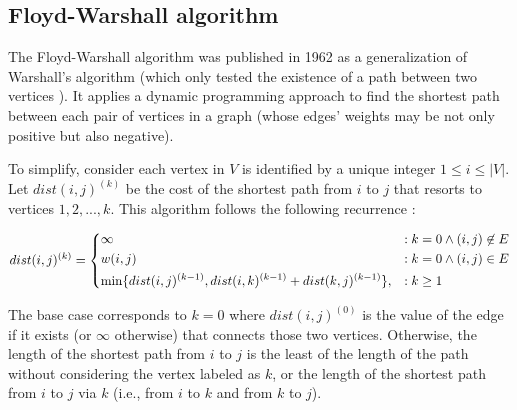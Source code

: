 \subsection{Floyd-Warshall algorithm} \label{algorithm-shortestpath-floydwarshall}
The Floyd-Warshall algorithm was published in 1962 as a generalization of Warshall's algorithm 
(which only tested the existence of a path between two vertices \cite[p.~346]{floyd-alg}). It applies a dynamic programming approach 
to find the shortest path between each pair of vertices in a graph (whose edges' weights may be not only positive but also negative).\par
To simplify, consider each vertex in $V$ is identified by a unique integer $1 \leq i \leq |V|$.
Let $dist(i, j)^{(k)}$ be the cost of the shortest path from $i$ to $j$ that resorts to vertices $1, 2, ..., k$.
This algorithm follows the following recurrence \cite[p.~694]{intro-alg}:

\begin{equation}
    dist(i,j)^{(k)}=\begin{dcases}
        \infty                                                         &: k=0 \wedge (i,j) \not \in E \\
        w(i,j)                                                         &: k=0 \wedge (i,j) \in E\\
        \min\{dist(i,j)^{(k-1)}, dist(i,k)^{(k-1)} + dist(k,j)^{(k-1)}\}, &: k \geq 1
    \end{dcases}
\end{equation}

The base case corresponds to $k=0$ where $dist(i, j)^{(0)}$ is the value of the edge if it exists (or $\infty$ otherwise) that connects those two vertices.
Otherwise, the length of the shortest path from $i$ to $j$ is the least of the length of the path without considering the vertex labeled as $k$,
or the length of the shortest path from $i$ to $j$ via $k$ (i.e., from $i$ to $k$ and from $k$ to $j$).\par

